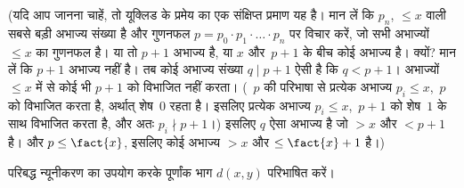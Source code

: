 \documentclass[../../../include/open-logic-section]{subfiles}
\begin{document}
(यदि आप जानना चाहें, तो यूक्लिड के प्रमेय का एक संक्षिप्त प्रमाण यह है।
मान लें कि $p_n$, $\le x$ वाली सबसे बड़ी अभाज्य संख्या है और गुणनफल
$p =
p_0\cdot p_1 \cdot \dots \cdot p_n$ पर विचार करें, जो सभी
अभाज्यों~$\le x$ का गुणनफल है। या तो $p+1$ अभाज्य है, या $x$ और~$p+1$ के बीच कोई
अभाज्य है। क्यों? मान लें कि $p+1$ अभाज्य नहीं है। तब कोई अभाज्य संख्या
$q \mid p+1$ ऐसी है कि $q < p+1$। अभाज्यों $\le x$ में से कोई भी
$p+1$ को विभाजित नहीं करता। (~$p$ की परिभाषा से प्रत्येक अभाज्य
$p_i \le x$,~$p$ को विभाजित करता है, अर्थात् शेष~$0$ रहता है। इसलिए
प्रत्येक अभाज्य $p_i \le x$,~$p+1$ को शेष~$1$ के साथ विभाजित करता है,
और अतः $p_i \nmid p+1$।) इसलिए $q$ ऐसा अभाज्य है जो $>
x$ और
$< p+1$ है। और $p \le \fact{x}$, इसलिए कोई अभाज्य $> x$ और $\le
\fact{x}+1$ है।)

\begin{prob}
परिबद्ध न्यूनीकरण का उपयोग करके पूर्णांक भाग $d(x, y)$ परिभाषित करें।
\end{prob}
\end{document}
